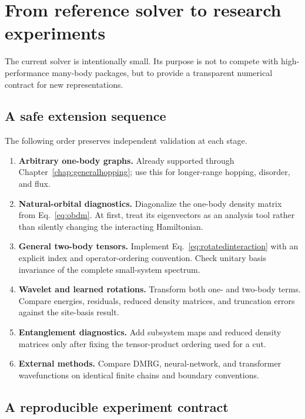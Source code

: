 \chapter{From reference solver to research experiments}
\label{chap:extensions}

The current solver is intentionally small.  Its purpose is not to compete with
high-performance many-body packages, but to provide a transparent numerical
contract for new representations.

\section{A safe extension sequence}

The following order preserves independent validation at each stage.
\begin{enumerate}
\item \textbf{Arbitrary one-body graphs.}  Already supported through
      Chapter~\ref{chap:generalhopping}; use this for longer-range hopping, disorder,
      and flux.
\item \textbf{Natural-orbital diagnostics.}  Diagonalize the one-body density
      matrix from Eq.~\eqref{eq:obdm}.  At first, treat its eigenvectors as an
      analysis tool rather than silently changing the interacting Hamiltonian.
\item \textbf{General two-body tensors.}  Implement Eq.~\eqref{eq:rotatedinteraction}
      with an explicit index and operator-ordering convention.  Check unitary
      basis invariance of the complete small-system spectrum.
\item \textbf{Wavelet and learned rotations.}  Transform both one- and two-body
      terms.  Compare energies, residuals, reduced density matrices, and
      truncation errors against the site-basis result.
\item \textbf{Entanglement diagnostics.}  Add subsystem maps and reduced density
      matrices only after fixing the tensor-product ordering used for a cut.
\item \textbf{External methods.}  Compare DMRG, neural-network, and transformer
      wavefunctions on identical finite chains and boundary conventions.
\end{enumerate}

\section{A reproducible experiment contract}

